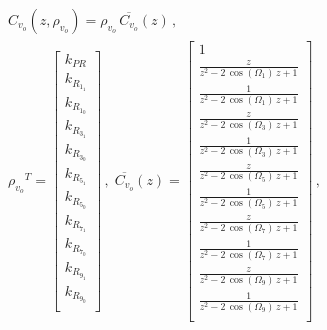 \documentclass[repeatfields,oneside]{tcc}
\newcommand{\mycdot}{ \, }
\newcommand{\myvo}{ {v_o} }
\newcommand{\myC}[2][]{ C_{#1} \left( #2 \right) }
\newcommand{\myoC}[2][]{ \overline{C_{#1}} \left( #2 \right) }
\newcommand{\myCzrho}[1]{ \myC[#1]{z, \rho_{#1}} }
\begin{document}
\begin{equation}
\begin{gathered}
    \myCzrho{\myvo} = \rho_\myvo \mycdot \myoC[\myvo]{z}
    \,,
    \\
    {\rho_\myvo}^T =
    \begin{bmatrix}
        k_{PR} \\
        k_{R_{1_{1}}} \\
        k_{R_{1_{0}}} \\
        k_{R_{3_{1}}} \\
        k_{R_{3_{0}}} \\
        k_{R_{5_{1}}} \\
        k_{R_{5_{0}}} \\
        k_{R_{7_{1}}} \\
        k_{R_{7_{0}}} \\
        k_{R_{9_{1}}} \\
        k_{R_{9_{0}}} \\
    \end{bmatrix}
    \,,\;
    \myoC[\myvo]{z} =
    \begin{bmatrix}
        1 \\
        \frac{ z }{ z^2 - 2 \mycdot \cos \left( \Omega_1 \right) \mycdot z + 1 } \\
        \frac{ 1 }{ z^2 - 2 \mycdot \cos \left( \Omega_1 \right) \mycdot z + 1 } \\
        \frac{ z }{ z^2 - 2 \mycdot \cos \left( \Omega_3 \right) \mycdot z + 1 } \\
        \frac{ 1 }{ z^2 - 2 \mycdot \cos \left( \Omega_3 \right) \mycdot z + 1 } \\
        \frac{ z }{ z^2 - 2 \mycdot \cos \left( \Omega_5 \right) \mycdot z + 1 } \\
        \frac{ 1 }{ z^2 - 2 \mycdot \cos \left( \Omega_5 \right) \mycdot z + 1 } \\
        \frac{ z }{ z^2 - 2 \mycdot \cos \left( \Omega_7 \right) \mycdot z + 1 } \\
        \frac{ 1 }{ z^2 - 2 \mycdot \cos \left( \Omega_7 \right) \mycdot z + 1 } \\
        \frac{ z }{ z^2 - 2 \mycdot \cos \left( \Omega_9 \right) \mycdot z + 1 } \\
        \frac{ 1 }{ z^2 - 2 \mycdot \cos \left( \Omega_9 \right) \mycdot z + 1 } \\
    \end{bmatrix}
    \,,
\end{gathered}
\end{equation}
\end{document}
